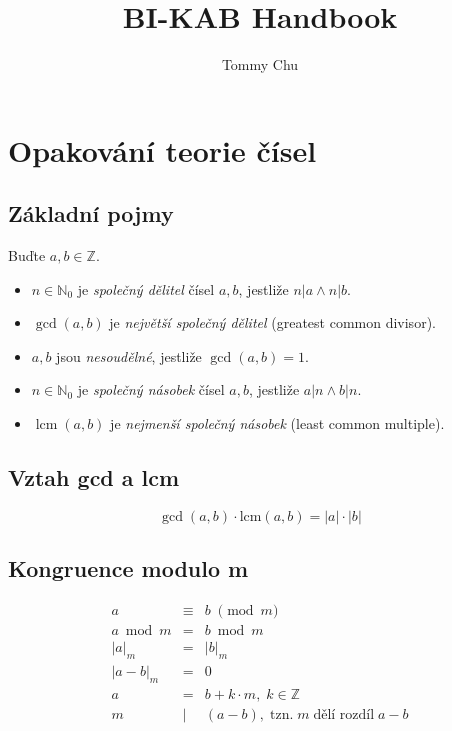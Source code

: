\documentclass[a4paper]{article}
\title{BI-KAB Handbook}
\author{Tommy Chu}
\date{}
\newcommand{\Z}{\mathbb{Z}}
\newcommand{\N}{\mathbb{N}}
\newcommand{\lcm}{\operatorname{lcm}}
\begin{document}
\twocolumn

\section{Opakování teorie čísel}

\subsection{Základní pojmy}

Buďte $a,b \in \Z$.

\begin{itemize}
    \item $n \in \N_0$ je \emph{společný dělitel} čísel $a, b$, jestliže $n|a \wedge n|b$.
    \item $\gcd(a,b)$ je \emph{největší společný dělitel} (greatest common divisor).
    \item $a,b$ jsou \emph{nesoudělné}, jestliže $\gcd(a,b)=1$.
    \item $n \in \N_0$ je \emph{společný násobek} čísel $a, b$, jestliže $a|n \wedge b|n$.
    \item $\lcm(a,b)$ je \emph{nejmenší společný násobek} (least common multiple).
\end{itemize}

\subsection{Vztah gcd a lcm}

\[
    \gcd(a, b) \cdot \text{lcm}(a, b) = |a| \cdot |b|
\]

\subsection{Kongruence modulo m}

\[
    \begin{array}{rcl}
        a         & \equiv & b \; \pmod m                                                \\
        a \bmod m & =      & b \bmod m                                                   \\
        |a|_m     & =      & |b|_m                                                       \\
        |a - b|_m & =      & 0                                                           \\
        a         & =      & b + k \cdot m, \; k \in \mathbb{Z}                          \\
        m         & \mid   & (a - b), \; \text{tzn.} \; m \; \text{dělí rozdíl} \; a - b \\
    \end{array}
\]
\end{document}
